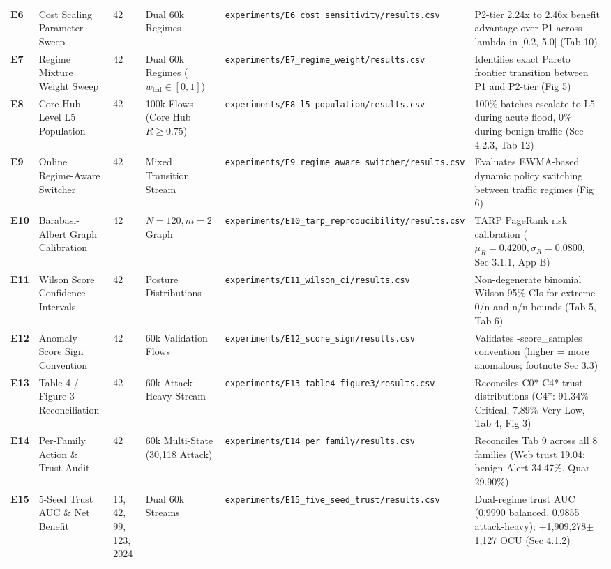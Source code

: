 \begin{table}[t]
\begin{tabular}{lp{2.8cm}p{1.8cm}p{2.6cm}p{3.8cm}p{4.2cm}}
\textbf{E6} & Cost Scaling Parameter Sweep & 42 & Dual 60k Regimes & \texttt{experiments/E6\_cost\_sensitivity/results.csv} & P2-tier 2.24x to 2.46x benefit advantage over P1 across lambda in [0.2, 5.0] (Tab 10) \\
\textbf{E7} & Regime Mixture Weight Sweep & 42 & Dual 60k Regimes ($w_{\text{bal}} \in [0, 1]$) & \texttt{experiments/E7\_regime\_weight/results.csv} & Identifies exact Pareto frontier transition between P1 and P2-tier (Fig 5) \\
\textbf{E8} & Core-Hub Level L5 Population & 42 & 100k Flows (Core Hub $R \ge 0.75$) & \texttt{experiments/E8\_l5\_population/results.csv} & 100\% batches escalate to L5 during acute flood, 0\% during benign traffic (Sec 4.2.3, Tab 12) \\
\textbf{E9} & Online Regime-Aware Switcher & 42 & Mixed Transition Stream & \texttt{experiments/E9\_regime\_aware\_switcher/results.csv} & Evaluates EWMA-based dynamic policy switching between traffic regimes (Fig 6) \\
\textbf{E10} & Barabasi-Albert Graph Calibration & 42 & $N=120, m=2$ Graph & \texttt{experiments/E10\_tarp\_reproducibility/results.csv} & TARP PageRank risk calibration ($\mu_R=0.4200, \sigma_R=0.0800$, Sec 3.1.1, App B) \\
\textbf{E11} & Wilson Score Confidence Intervals & 42 & Posture Distributions & \texttt{experiments/E11\_wilson\_ci/results.csv} & Non-degenerate binomial Wilson 95\% CIs for extreme 0/n and n/n bounds (Tab 5, Tab 6) \\
\textbf{E12} & Anomaly Score Sign Convention & 42 & 60k Validation Flows & \texttt{experiments/E12\_score\_sign/results.csv} & Validates -score\_samples convention (higher = more anomalous; footnote Sec 3.3) \\
\textbf{E13} & Table 4 / Figure 3 Reconciliation & 42 & 60k Attack-Heavy Stream & \texttt{experiments/E13\_table4\_figure3/results.csv} & Reconciles C0*-C4* trust distributions (C4*: 91.34\% Critical, 7.89\% Very Low, Tab 4, Fig 3) \\
\textbf{E14} & Per-Family Action \& Trust Audit & 42 & 60k Multi-State (30,118 Attack) & \texttt{experiments/E14\_per\_family/results.csv} & Reconciles Tab 9 across all 8 families (Web trust 19.04; benign Alert 34.47\%, Quar 29.90\%) \\
\textbf{E15} & 5-Seed Trust AUC \& Net Benefit & 13, 42, 99, 123, 2024 & Dual 60k Streams & \texttt{experiments/E15\_five\_seed\_trust/results.csv} & Dual-regime trust AUC (0.9990 balanced, 0.9855 attack-heavy); +1,909,278$\pm$1,127 OCU (Sec 4.1.2) \\

\end{tabular}
\end{table}

